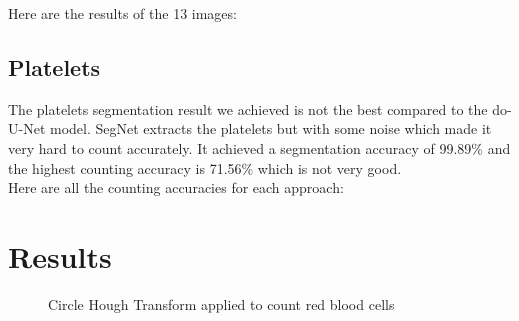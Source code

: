 Here are the results of the 13 images:



\subsection{Platelets}
\hspace{\parindent}
The platelets segmentation result we achieved is not the best compared to the do-U-Net model. SegNet extracts the platelets but with some noise which made it very hard to count accurately.
It achieved a segmentation accuracy of 99.89\% and the highest counting accuracy is 71.56\% which is not very good.\\
Here are all the counting accuracies for each approach:



\section{Results}
\vspace{0.2in}
\hspace{\parindent}

\begin{figure}[H]
\centering
\begin{minipage}{.5\textwidth}
  \centering
\end{minipage}%
\begin{minipage}{.5\textwidth}
  \centering
\end{minipage}
  \caption{Circle Hough Transform applied to count red blood cells}
\end{figure}


